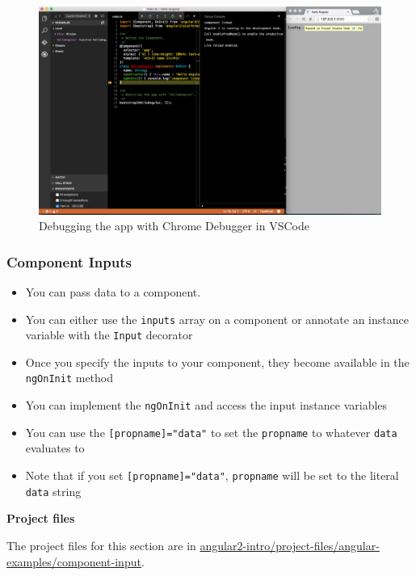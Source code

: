 \documentclass[12pt,]{article}
\providecommand{\tightlist}{%
  \setlength{\itemsep}{0pt}\setlength{\parskip}{0pt}}
\begin{document}
\begin{figure}[htbp]
\centering
\includegraphics{images/run-debugger.png}
\caption{Debugging the app with Chrome Debugger in VSCode}
\end{figure}

\subsubsection{Component Inputs}\label{component-inputs}

\begin{itemize}
\tightlist
\item
  You can pass data to a component.
\item
  You can either use the \texttt{inputs} array on a component or
  annotate an instance variable with the \texttt{Input} decorator
\item
  Once you specify the inputs to your component, they become available
  in the \texttt{ngOnInit} method
\item
  You can implement the \texttt{ngOnInit} and access the input instance
  variables
\item
  You can use the \texttt{{[}propname{]}="data"} to set the
  \texttt{propname} to whatever \texttt{data} evaluates to
\item
  Note that if you set
  \texttt{{[}propname{]}="\textquotesingle{}data\textquotesingle{}"},
  \texttt{propname} will be set to the literal \texttt{data} string
\end{itemize}

\textbf{Project files}

The project files for this section are in
\href{https://github.com/st32lth/angular2-intro/tree/master/project-files/angular-examples/component-input}{angular2-intro/project-files/angular-examples/component-input}.
\end{document}
